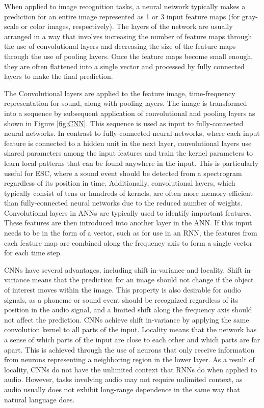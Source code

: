 When applied to image recognition tasks, a neural network typically makes a prediction for an entire image represented as 1 or 3 input feature maps (for gray-scale or color images, respectively). The layers of the network are usually arranged in a way that involves increasing the number of feature maps through the use of convolutional layers and decreasing the size of the feature maps through the use of pooling layers. Once the feature maps become small enough, they are often flattened into a single vector and processed by fully connected layers to make the final prediction.

The
Convolutional layers are applied to the feature image, time-frequency representation for sound, along with pooling layers. The image is transformed into a sequence by subsequent application of convolutional and pooling layers as shown in Figure \ref{fig:CNN}. This sequence is used as input to fully-connected neural networks. In contrast to fully-connected neural networks, where each input feature is connected to a hidden unit in the next layer, convolutional layers use shared parameters among the input features and train the kernel parameters to learn local patterns that can be found anywhere in the input. This is particularly useful for ESC, where a sound event should be detected from a spectrogram regardless of its position in time. Additionally, convolutional layers, which typically consist of tens or hundreds of kernels, are often more memory-efficient than fully-connected neural networks due to the reduced number of weights. Convolutional layers in ANNs are typically used to identify important features. These features are then introduced into another layer in the ANN. If this input needs to be in the form of a vector, such as for use in an RNN, the features from each feature map are combined along the frequency axis to form a single vector for each time step. 

CNNs have several advantages, including shift in-variance and locality. Shift in-variance means that the prediction for an image should not change if the object of interest moves within the image. This property is also desirable for audio signals, as a phoneme or sound event should be recognized regardless of its position in the audio signal, and a limited shift along the frequency axis should not affect the prediction. CNNs achieve shift in-variance by applying the same convolution kernel to all parts of the input. Locality means that the network has a sense of which parts of the input are close to each other and which parts are far apart. This is achieved through the use of neurons that only receive information from neurons representing a neighboring region in the lower layer. As a result of locality, CNNs do not have the unlimited context that RNNs do when applied to audio. However, tasks involving audio may not require unlimited context, as audio usually does not exhibit long-range dependence in the same way that natural language does.


